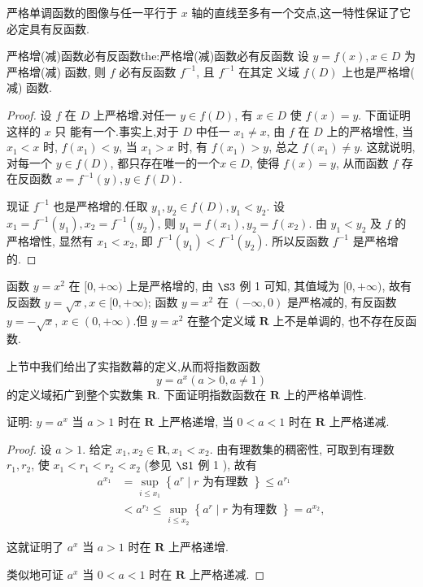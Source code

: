 严格单调函数的图像与任一平行于 $x$ 轴的直线至多有一个交点,这一特性保证了它必定具有反函数.

\begin{theorem}{严格增(减)函数必有反函数}{the:严格增(减)函数必有反函数}
	设 $y=f(x), x \in D$ 为严格增(减) 函数, 则 $f$ 必有反函数 $f^{-1}$, 且 $f^{-1}$ 在其定 义域 $f(D)$ 上也是严格增( 减) 函数.
\end{theorem}

\begin{proof}
	设 $f$ 在 $D$ 上严格增.对任一 $y \in f(D)$, 有 $x \in D$ 使 $f(x)=y .$ 下面证明这样的 $x$ 只 能有一个.事实上,对于 $D$ 中任一 $x_{1} \neq x$, 由 $f$ 在 $D$ 上的严格增性, 当 $x_{1}<x$ 时, $f\left(x_{1}\right)<y$, 当 $x_{1}>x$ 时, 有 $f\left(x_{1}\right)>y$, 总之 $f\left(x_{1}\right) \neq y$. 这就说明, 对每一个 $y \in f(D)$, 都只存在唯一的一个$x \in D$, 使得 $f(x)=y$, 从而函数 $f$ 存在反函数 $x=f^{-1}(y), y \in f(D)$.

	现证 $f^{-1}$ 也是严格增的.任取 $y_{1}, y_{2} \in f(D), y_{1}<y_{2} .$ 设 $x_{1}=f^{-1}\left(y_{1}\right), x_{2}=f^{-1}\left(y_{2}\right)$, 则 $y_{1}=f\left(x_{1}\right), y_{2}=f\left(x_{2}\right)$. 由 $y_{1}<y_{2}$ 及 $f$ 的严格增性, 显然有 $x_{1}<x_{2}$, 即 $f^{-1}\left(y_{1}\right)<f^{-1}\left(y_{2}\right)$. 所以反函数 $f^{-1}$ 是严格增的.
\end{proof}

\begin{example}
	函数 $y=x^{2}$ 在 $[0,+\infty)$ 上是严格增的, 由 $\S 3$ 例 1 可知, 其值域为 $[0,+\infty)$, 故有反函数 $y=\sqrt{x}, x \in[0,+\infty)$; 函数 $y=x^{2}$ 在 $(-\infty, 0)$ 是严格减的, 有反函数 $y=-\sqrt{x}$, $x \in(0,+\infty)$.但 $y=x^{2}$ 在整个定义域 $\mathbf{R}$ 上不是单调的, 也不存在反函数.
\end{example}


上节中我们给出了实指数幕的定义,从而将指数函数
\[
y=a^{x}(a>0, a \neq 1)
\]
的定义域拓广到整个实数集 $\mathbf{R} .$ 下面证明指数函数在 $\mathbf{R}$ 上的严格单调性.

\begin{example}
	证明: $y=a^{x}$ 当 $a>1$ 时在 $\mathbf{R}$ 上严格递增, 当 $0<a<1$ 时在 $\mathbf{R}$ 上严格递减.
\end{example}

\begin{proof}
	设 $a>1 .$ 给定 $x_{1}, x_{2} \in \mathbf{R}, x_{1}<x_{2}$. 由有理数集的稠密性, 可取到有理数 $r_{1}, r_{2}$, 使 $x_{1}<r_{1}<r_{2}<x_{2}$ (参见 $\S 1$ 例 1 ), 故有
	\[
	\begin{aligned}
		a^{x_{1}} &=\sup _{i \leqslant x_{1}}\left\{a^{r} \mid r \text { 为有理数 }\right\} \leqslant a^{r_{1}} \\
		&<a^{r_{2}} \leqslant \sup _{i \leqslant x_{2}}\left\{a^{r} \mid r \text { 为有理数 }\right\}=a^{x_{2}},
	\end{aligned}
	\]

	这就证明了 $a^{x}$ 当 $a>1$ 时在 $\mathbf{R}$ 上严格递增.

	类似地可证 $a^{x}$ 当 $0<a<1$ 时在 $\mathbf{R}$ 上严格递减.
\end{proof}

